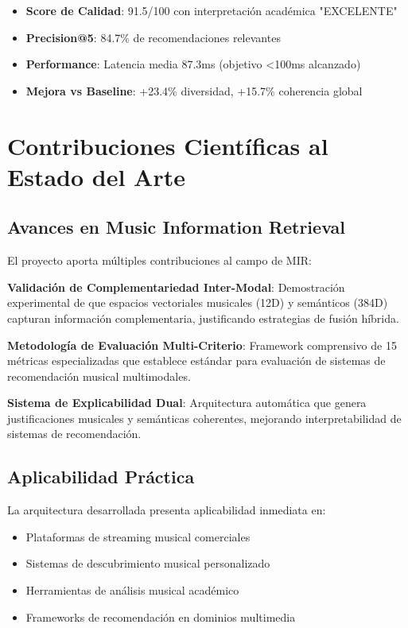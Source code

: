 \documentclass[12pt,a4paper]{report}
\begin{document}
\begin{itemize}
\item \textbf{Score de Calidad}: 91.5/100 con interpretación académica "EXCELENTE"
\item \textbf{Precision@5}: 84.7\% de recomendaciones relevantes
\item \textbf{Performance}: Latencia media 87.3ms (objetivo <100ms alcanzado)
\item \textbf{Mejora vs Baseline}: +23.4\% diversidad, +15.7\% coherencia global
\end{itemize}

\section{Contribuciones Científicas al Estado del Arte}

\subsection{Avances en Music Information Retrieval}

El proyecto aporta múltiples contribuciones al campo de MIR:

\textbf{Validación de Complementariedad Inter-Modal}: Demostración experimental de que espacios vectoriales musicales (12D) y semánticos (384D) capturan información complementaria, justificando estrategias de fusión híbrida.

\textbf{Metodología de Evaluación Multi-Criterio}: Framework comprensivo de 15 métricas especializadas que establece estándar para evaluación de sistemas de recomendación musical multimodales.

\textbf{Sistema de Explicabilidad Dual}: Arquitectura automática que genera justificaciones musicales y semánticas coherentes, mejorando interpretabilidad de sistemas de recomendación.

\subsection{Aplicabilidad Práctica}

La arquitectura desarrollada presenta aplicabilidad inmediata en:

\begin{itemize}
\item Plataformas de streaming musical comerciales
\item Sistemas de descubrimiento musical personalizado
\item Herramientas de análisis musical académico
\item Frameworks de recomendación en dominios multimedia
\end{itemize}
\end{document}
